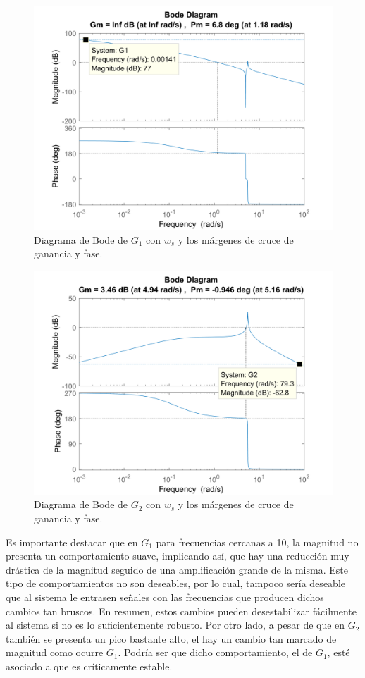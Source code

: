 \documentclass[journal]{IEEEtran}
\begin{document}
\begin{figure}[h!]
\caption{Diagrama de Bode de $G_1$ con $w_s$ y los márgenes de cruce de ganancia y fase.\label{fig:bode1}}
  \centering
\includegraphics[scale=0.25]{Bode/BodeG1.png}
\end{figure}

\begin{figure}[h!]
\caption{Diagrama de Bode de $G_2$ con $w_s$ y los márgenes de cruce de ganancia y fase.\label{fig:bode2}}
  \centering
\includegraphics[scale=0.25]{Bode/BodeG2.png}
\end{figure}

Es importante destacar que en $G_1$ para frecuencias cercanas a 10, la magnitud no presenta un comportamiento suave, implicando así, que hay una reducción muy drástica de la magnitud seguido de una amplificación grande de la misma. Este tipo de comportamientos no son deseables, por lo cual, tampoco sería deseable que al sistema le entrasen señales con las frecuencias que producen dichos cambios tan bruscos. En resumen, estos cambios pueden desestabilizar fácilmente al sistema si no es lo suficientemente robusto. Por otro lado, a pesar de que en $G_2$ también se presenta un pico bastante alto, el hay un cambio tan marcado de magnitud como ocurre $G_1$. Podría ser que dicho comportamiento, el de $G_1$, esté asociado a que es críticamente estable.
\end{document}
